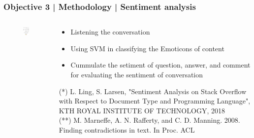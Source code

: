 \documentclass{beamer}
\begin{document}
\begin{frame}
\frametitle{Objective 3 | Methodology | Sentiment analysis}
\begin{columns}
	
	\begin{column}{.5\textwidth}
\begin{figure}
	\includegraphics[width=48mm]{st7.png}	
	
\end{figure}
\end{column}


\begin{column}{.5\textwidth}
{\scriptsize \begin{itemize}
	\item Listening the conversation
	\item Using SVM in classifying the Emoticons of content
	\item Cummulate the setiment of question, answer, and comment for evaluating the sentiment of conversation
\end{itemize}}


{\tiny (*) L. Ling, S. Larsen, "Sentiment Analysis on Stack Overflow with
Respect to Document Type and
Programming Language", KTH ROYAL INSTITUTE OF TECHNOLOGY, 2018}\\
{\tiny (**) M. Marneffe, A. N. Rafferty, and
C. D. Manning. 2008. Finding contradictions in text. In Proc. ACL}\\

\end{column}

\end{columns}	
\end{frame}
\end{document}
